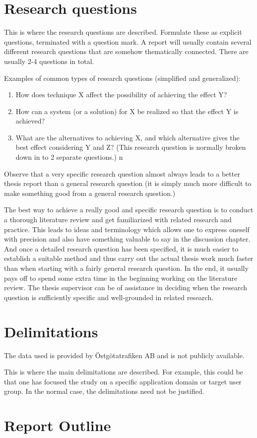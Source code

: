 \section{Research questions}
\label{sec:research-questions}

This is where the research questions are described.
Formulate these as explicit questions, terminated with a
question mark. A report will usually contain several different
research questions that are somehow thematically connected.
There are usually 2-4 questions in total.

Examples of common types of research questions (simplified
and generalized):

\begin{enumerate}
\item How does technique X affect the possibility of achieving the
  effect Y?

\item How can a system (or a solution) for X be realized so
  that the effect Y is achieved?

\item What are the alternatives to
  achieving X, and which alternative gives the best effect considering
  Y and Z? (This research question is normally broken down in to 2
  separate questions.)
n
\end{enumerate}

Observe that a very specific research question almost always
leads to a better thesis report than a general research question
(it is simply much more difficult to make something good
from a general research question.)

The best way to achieve a really good and specific research
question is to conduct a thorough literature review and get
familiarized with related research and practice. This leads to
ideas and terminology which allows one to express oneself
with precision and also have something valuable to say in the
discussion chapter. And once a detailed research question
has been specified, it is much easier to establish a suitable
method and thus carry out the actual thesis work much faster
than when starting with a fairly general research question. In
the end, it usually pays off to spend some extra time in the
beginning working on the literature review. The thesis
supervisor can be of assistance in deciding when the research
question is sufficiently specific and well-grounded in related
research.

\section{Delimitations}
\label{sec:delimitations}
The data used is provided by Östgötatrafiken AB and is not publicly
available. 

This is where the main delimitations are described. For
example, this could be that one has focused the study on a
specific application domain or target user group. In the
normal case, the delimitations need not be justified.

\section{Report Outline}
